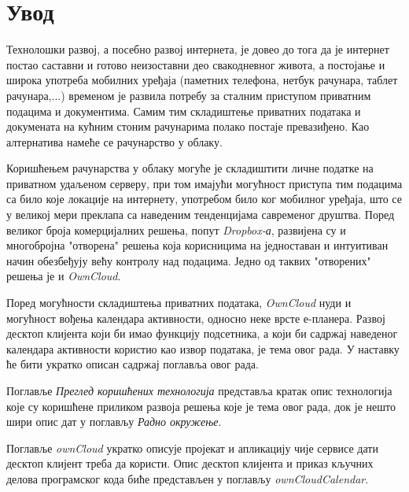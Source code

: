 \chapter{Увод}

Технолошки развој, а посебно развој интернета, је довео до тога да је интернет постао саставни и готово неизоставни део свакодневног живота, а постојање и широка употреба мобилних уређаја (паметних телефона, нетбук рачунара, таблет рачунара,...) временом је развила потребу за сталним приступом приватним подацима и документима. Самим тим складиштење приватних података и докумената на кућним стоним рачунарима полако постаје превазиђено. Као алтернатива намеће се рачунарство у облаку.

Коришћењем рачунарства у облаку могуће је складиштити личне податке на приватном удаљеном серверу, при том имајући могућност приступа тим подацима са било које локације на интернету, употребом било ког мобилног уређаја, што се у великој мери преклапа са наведеним тенденцијама савременог друштва. Поред великог броја комерцијалних решења, попут \textit{Dropbox-а}, развијена су и многобројна "отворена" решења која корисницима на једноставан и интуитиван начин обезбеђују већу контролу над подацима. Једно од таквих "отворених" решења је и \textit{OwnCloud}. 

Поред могућности складиштења приватних података, \textit{OwnCloud} нуди и могућност вођења календара активности, односно неке врсте е-планера. Развој десктоп клијента који би имао функцију подсетника, а који би садржај наведеног календара активности користио као извор података, је тема овог рада. У наставку ће бити укратко описан садржај поглавља овог рада.

Поглавље \textit{Преглед коришћених технологија} представља кратак опис технологија које су коришћене приликом развоја решења које је тема овог рада, док је нешто шири опис дат у поглављу \textit{Радно окружење}.

Поглавље \textit{ownCloud} укратко описује пројекат и апликацију чије сервисе дати десктоп клијент треба да користи. Опис десктоп клијента и приказ кључних делова програмског кода биће представљен у поглављу \textit{ownCloudCalendar}. 